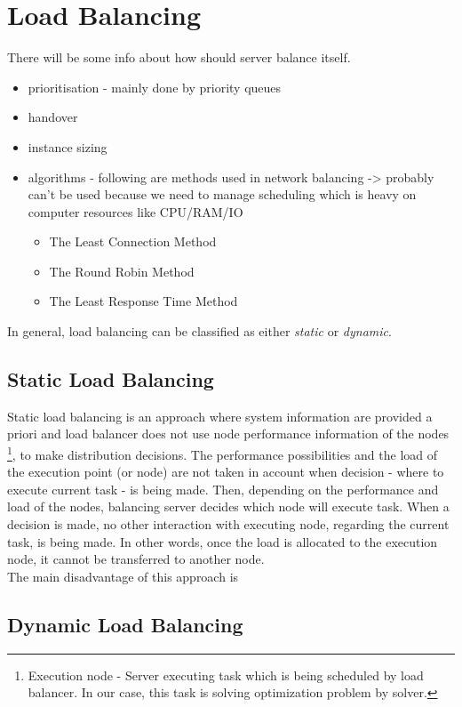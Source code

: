 
\section{Load Balancing}\label{sec:load-balancing}
There will be some info about how should server balance itself.
\begin{itemize}
    \item prioritisation - mainly done by priority queues
    \item handover
    \item instance sizing
    \item algorithms - following are methods used in network balancing -> probably can't be used because we need to manage scheduling
    which is heavy on computer resources like CPU/RAM/IO
    \begin{itemize}
        \item The Least Connection Method
        \item The Round Robin Method
        \item The Least Response Time Method
    \end{itemize}
\end{itemize}

In general, load balancing can be classified as either \textit{static} or \textit{dynamic}.

\subsection{Static Load Balancing}\label{subsec:static-load-balancing}
Static load balancing is an approach where system information are provided a priori
and load balancer does not use node performance information of the nodes
\footnote{Execution node - Server executing task which is being scheduled by load balancer.
In our case, this task is solving optimization problem by solver.}, to make distribution decisions.
The performance possibilities and the load of the execution point (or node) are not taken in account
when decision - where to execute current task - is being made.
Then, depending on the performance and load of the nodes, balancing server decides which node will execute task.
When a decision is made, no other interaction with executing node, regarding the current task, is being made.
In other words, once the load is allocated to the execution node, it cannot be transferred to another node.\\
The main disadvantage of this approach is

\subsection{Dynamic Load Balancing}\label{subsec:dynamic-load-balancing}
